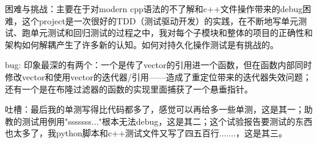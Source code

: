 \documentclass[fontset=none]{article}
\begin{document}
困难与挑战：主要在于对modern cpp语法的不了解和c++文件操作带来的debug困难，这个project是一次很好的TDD（测试驱动开发）的实践，在不断地写单元测试、跑单元测试和回归测试的过程之中，我对每个子模块和整体的项目的正确性和架构如何解耦产生了许多新的认知。如何对持久化操作测试是有挑战的。

bug: 印象最深的有两个：一个是传了vector的引用进一个函数，但在函数内部同时修改vector和使用vector的迭代器/引用——造成了重定位带来的迭代器失效问题；还有一个是在布隆过滤器的函数的实现里面捕获了一个悬垂指针。

吐槽：最后我的单测写得比代码都多了，感觉可以再给多一些单测，这是其一；助教的测试用例用"sssssss..."根本无法debug，这是其二；这个试验报告要测试的东西也太多了，我python脚本和c++测试文件又写了四五百行.......，这是其三。


% 
\end{document}
